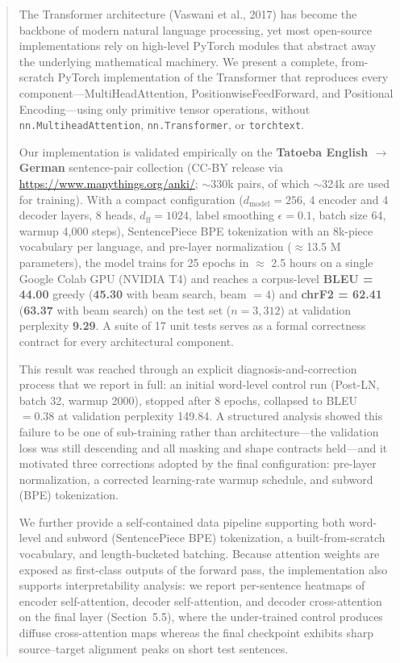 \begin{abstract}
The Transformer architecture (Vaswani et al., 2017) has become the backbone of modern natural language processing, yet most open-source implementations rely on high-level PyTorch modules that abstract away the underlying mathematical machinery. We present a complete, from-scratch PyTorch implementation of the Transformer that reproduces every component---MultiHeadAttention, PositionwiseFeedForward, and Positional Encoding---using only primitive tensor operations, without \texttt{nn.MultiheadAttention}, \texttt{nn.Transformer}, or \texttt{torchtext}.

Our implementation is validated empirically on the \textbf{Tatoeba English $\rightarrow$ German} sentence-pair collection (CC-BY release via \url{https://www.manythings.org/anki/}; $\sim$330k pairs, of which $\sim$324k are used for training). With a compact configuration ($d_{\text{model}} = 256$, 4 encoder and 4 decoder layers, 8 heads, $d_{\text{ff}} = 1024$, label smoothing $\epsilon = 0.1$, batch size 64, warmup 4{,}000 steps), SentencePiece BPE tokenization with an 8k-piece vocabulary per language, and pre-layer normalization ($\approx$13.5 M parameters), the model trains for 25 epochs in $\approx$ 2.5 hours on a single Google Colab GPU (NVIDIA T4) and reaches a corpus-level \textbf{BLEU = 44.00} greedy (\textbf{45.30} with beam search, beam $=4$) and \textbf{chrF2 = 62.41} (\textbf{63.37} with beam search) on the test set ($n = 3{,}312$) at validation perplexity \textbf{9.29}. A suite of 17 unit tests serves as a formal correctness contract for every architectural component.

This result was reached through an explicit diagnosis-and-correction process that we report in full: an initial word-level control run (Post-LN, batch 32, warmup 2000), stopped after 8 epochs, collapsed to BLEU $= 0.38$ at validation perplexity 149.84. A structured analysis showed this failure to be one of sub-training rather than architecture---the validation loss was still descending and all masking and shape contracts held---and it motivated three corrections adopted by the final configuration: pre-layer normalization, a corrected learning-rate warmup schedule, and subword (BPE) tokenization.

We further provide a self-contained data pipeline supporting both word-level and subword (SentencePiece BPE) tokenization, a built-from-scratch vocabulary, and length-bucketed batching. Because attention weights are exposed as first-class outputs of the forward pass, the implementation also supports interpretability analysis: we report per-sentence heatmaps of encoder self-attention, decoder self-attention, and decoder cross-attention on the final layer (Section~5.5), where the under-trained control produces diffuse cross-attention maps whereas the final checkpoint exhibits sharp source--target alignment peaks on short test sentences.


\end{abstract}
